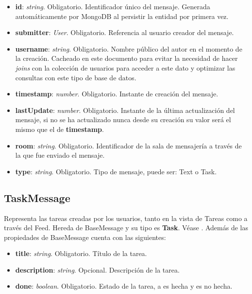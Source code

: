 \begin{itemize}
    \item \textbf{id}: \emph{string}. Obligatorio. Identificador único del mensaje. Generada automáticamente por MongoDB al persistir la entidad por primera vez.
    \item \textbf{submitter}: \emph{User}. Obligatorio. Referencia al usuario creador del mensaje.
    \item \textbf{username}: \emph{string}. Obligatorio. Nombre público del autor en el momento de la creación. Cacheado en este documento para evitar la necesidad de hacer \emph{\glspl{join}} con la colección de usuarios para acceder a este dato y optimizar las consultas con este tipo de base de datos.
    \item \textbf{timestamp}: \emph{number}. Obligatorio. Instante de creación del mensaje.
    \item \textbf{lastUpdate}: \emph{number}. Obligatorio. Instante de la última actualización del mensaje, si no se ha actualizado nunca desde su creación su valor será el mismo que el de \textbf{timestamp}.
    \item \textbf{room}: \emph{string}. Obligatorio. Identificador de la sala de mensajería a través de la que fue enviado el mensaje.
    \item \textbf{type}: \emph{string}. Obligatorio. Tipo de mensaje, puede ser: Text o Task.
\end{itemize}

\subsection{TaskMessage}
\label{ssec:task_message}

Representa las tareas creadas por los usuarios, tanto en la vista de Tareas como a través del Feed. Hereda de BaseMessage y su tipo es \textbf{Task}. Véase . Además de las propiedades de BaseMessage cuenta con las siguientes:

\begin{itemize}
    \item \textbf{title}: \emph{string}. Obligatorio. Título de la tarea.
    \item \textbf{description}: \emph{string}. Opcional. Descripción de la tarea.
    \item \textbf{done}: \emph{boolean}. Obligatorio. Estado de la tarea, a  es hecha y  es no hecha.
\end{itemize}


